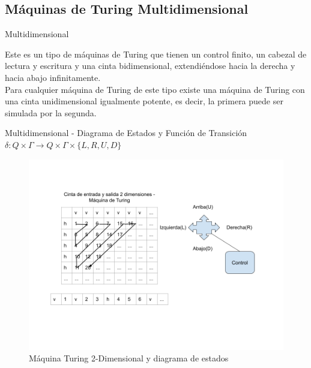 \documentclass[11pt]{beamer}
\begin{document}
	\subsection{Máquinas de Turing Multidimensional}
	    \begin{frame}{Multidimensional}
			\justifying
			
			Este es un tipo de máquinas de Turing que tienen un control finito, un cabezal de lectura y escritura y una cinta bidimensional, extendiéndose hacia la derecha y hacia abajo infinitamente. \\
			Para cualquier máquina de Turing de este tipo existe una máquina de Turing con una cinta unidimensional igualmente potente, es decir, la primera puede ser simulada por la segunda. 
			
		\end{frame}
		\begin{frame}{Multidimensional - Diagrama de Estados y Función de Transición }
			\justifying
			$\delta : Q \times \Gamma \rightarrow Q \times \Gamma \times \{ L, R, U,D \}$ \\
			\begin{figure}[H]
				\centering
				\includegraphics[scale=0.30]{img/multidimensional.png}
				\caption{Máquina Turing 2-Dimensional y diagrama de estados}
				\label{fig: MultiDimensional}
			\end{figure}
			
			
		\end{frame}
	
\end{document}
